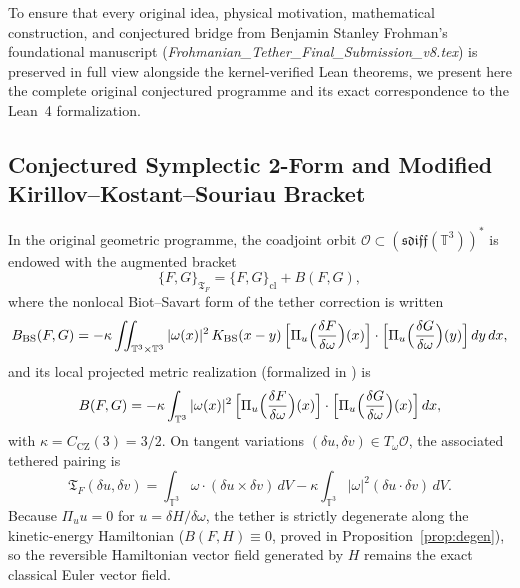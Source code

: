 \documentclass[11pt,a4paper]{article}
\theoremstyle{plain}
\theoremstyle{definition}
\theoremstyle{remark}
\newcommand{\T}{\mathbb{T}^3}
\newcommand{\Tf}{\mathfrak{T}_F}
\newcommand{\CZ}{C_{\mathrm{CZ}}}
\begin{document}
To ensure that every original idea, physical motivation, mathematical construction, and conjectured bridge from Benjamin Stanley Frohman's foundational manuscript (\emph{Frohmanian\_Tether\_Final\_Submission\_v8.tex}) is preserved in full view alongside the kernel-verified Lean theorems, we present here the complete original conjectured programme and its exact correspondence to the Lean~4 formalization.

\subsection{Conjectured Symplectic 2-Form and Modified Kirillov--Kostant--Souriau Bracket}
In the original geometric programme, the coadjoint orbit $\mathcal{O}\subset(\mathfrak{sdiff}(\T))^*$ is endowed with the augmented bracket
\begin{equation}\label{eq:orig_bracket}
\{F,G\}_{\Tf} = \{F,G\}_{\mathrm{cl}} + B(F,G),
\end{equation}
where the nonlocal Biot--Savart form of the tether correction is written
\begin{equation}\label{eq:orig_nonlocal_B}
B_{\mathrm{BS}}(F,G) = -\kappa \iint_{\T\times\T} |\omega(x)|^2\,K_{\mathrm{BS}}(x-y)\,\Bigl[\Pi_u\Bigl(\frac{\delta F}{\delta\omega}\Bigr)(x)\Bigr]\cdot\Bigl[\Pi_u\Bigl(\frac{\delta G}{\delta\omega}\Bigr)(y)\Bigr]\,dy\,dx,
\end{equation}
and its local projected metric realization (formalized in ) is
\begin{equation}\label{eq:orig_local_B}
B(F,G) = -\kappa \int_{\T} |\omega(x)|^2\,\Bigl[\Pi_u\Bigl(\frac{\delta F}{\delta\omega}\Bigr)(x)\Bigr]\cdot\Bigl[\Pi_u\Bigl(\frac{\delta G}{\delta\omega}\Bigr)(x)\Bigr]\,dx,
\end{equation}
with $\kappa = \CZ(3) = 3/2$. On tangent variations $(\delta u,\delta v)\in T_\omega\mathcal{O}$, the associated tethered pairing is
\begin{equation}\label{eq:orig_2form}
\Tf(\delta u,\delta v) = \int_{\T}\omega\cdot(\delta u\times\delta v)\,dV - \kappa\int_{\T}|\omega|^2(\delta u\cdot\delta v)\,dV.
\end{equation}
Because $\Pi_u u = 0$ for $u=\delta H/\delta\omega$, the tether is strictly degenerate along the kinetic-energy Hamiltonian ($B(F,H)\equiv0$, proved in Proposition~\ref{prop:degen}), so the reversible Hamiltonian vector field generated by $H$ remains the exact classical Euler vector field.
\end{document}

